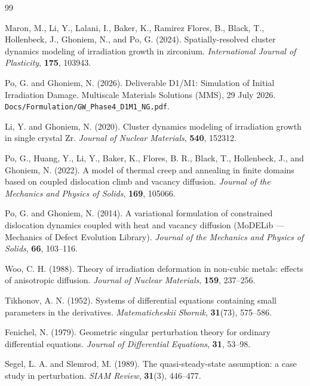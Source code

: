 \documentclass[11pt]{article}
\newcommand{\code}[1]{\texttt{#1}}
\begin{document}
\begin{thebibliography}{99}

Maron, M., Li, Y., Lalani, I., Baker, K., Ramirez Flores, B., Black, T.,
Hollenbeck, J., Ghoniem, N., and Po, G. (2024).
\newblock Spatially-resolved cluster dynamics modeling of irradiation growth in
zirconium.
\newblock \emph{International Journal of Plasticity}, \textbf{175}, 103943.

Po, G. and Ghoniem, N. (2026).
\newblock Deliverable D1/M1: Simulation of Initial Irradiation Damage.
\newblock Multiscale Materials Solutions (MMS), 29 July 2026.
\newblock \code{Docs/Formulation/GW\_Phase4\_D1M1\_NG.pdf}.

Li, Y. and Ghoniem, N. (2020).
\newblock Cluster dynamics modeling of irradiation growth in single crystal Zr.
\newblock \emph{Journal of Nuclear Materials}, \textbf{540}, 152312.

Po, G., Huang, Y., Li, Y., Baker, K., Flores, B. R., Black, T., Hollenbeck, J.,
and Ghoniem, N. (2022).
\newblock A model of thermal creep and annealing in finite domains based on
coupled dislocation climb and vacancy diffusion.
\newblock \emph{Journal of the Mechanics and Physics of Solids}, \textbf{169}, 105066.

Po, G. and Ghoniem, N. (2014).
\newblock A variational formulation of constrained dislocation dynamics coupled
with heat and vacancy diffusion (MoDELib --- Mechanics of Defect Evolution
Library).
\newblock \emph{Journal of the Mechanics and Physics of Solids}, \textbf{66}, 103--116.

Woo, C. H. (1988).
\newblock Theory of irradiation deformation in non-cubic metals: effects of
anisotropic diffusion.
\newblock \emph{Journal of Nuclear Materials}, \textbf{159}, 237--256.

Tikhonov, A. N. (1952).
\newblock Systems of differential equations containing small parameters in the
derivatives.
\newblock \emph{Matematicheskii Sbornik}, \textbf{31}(73), 575--586.

Fenichel, N. (1979).
\newblock Geometric singular perturbation theory for ordinary differential
equations.
\newblock \emph{Journal of Differential Equations}, \textbf{31}, 53--98.

Segel, L. A. and Slemrod, M. (1989).
\newblock The quasi-steady-state assumption: a case study in perturbation.
\newblock \emph{SIAM Review}, \textbf{31}(3), 446--477.


\end{thebibliography}
\end{document}
